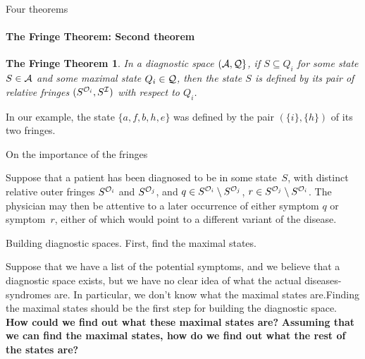 \documentclass{beamer}
\newtheorem{fringe}[theorem]{The Fringe Theorem}
\def\tl{\vskip 2mm}
\def\wl{\vskip 4mm}
\def\SB{\subseteq}
\def\AAA{{\cal A}}
\def\III{{\cal I}}
\def\OOO{{\cal O}}
\def\QQQ{{\cal Q}}
\begin{document}
\begin{frame}{Four theorems}
\framesubtitle{The Fringe Theorem: Second theorem}
\vspace{1cm}
\begin{fringe}
 In a diagnostic space $(\AAA,\QQQ\}$, if $S\SB Q_i$ for some state $S\in \AAA$ and some maximal state $Q_i\in\QQQ$, then the state $S$ is defined by its pair of relative fringes 
$(S^{\OOO_i},S^{\III})$
with respect to $Q_i$. 
\end{fringe}
\wl
In our example, the state $\{a,f,b,h,e\}$ was defined by the pair $(\{i\},\{h\})$ of its two fringes.
 \vspace{.5cm}

\end{frame}
\begin{frame}{On the importance of the fringes}
\center
\begin{minipage}{11cm}

Suppose that a patient has been diagnosed to be in some state~$S$, with distinct relative outer fringes $S^{\OOO_i}$ and $S^{\OOO_j}$, and $q\in S^{\OOO_i}\setminus S^{\OOO_j}$, $r\in S^{\OOO_j}\setminus S^{\OOO_i}$. The physician may then be attentive to a later occurrence of either symptom $q$ or symptom~$r$, either of which would point  to a different variant of the disease.  

\end{minipage}
 \vspace{.5cm}

\end{frame}
\begin{frame}{Building diagnostic spaces. First, find the maximal states.}
\center
\begin{minipage}{10cm} Suppose that we have a list of the potential symptoms, and we believe that a diagnostic space exists, but we have no clear idea of what the actual diseases-syndromes are. 
\tl
In particular, we don't know what the maximal states are.\linebreak Finding the maximal states should be the first step for building the diagnostic space. 
\tl
{\bf How could we find out  what these maximal states are?}
\tl
{\bf Assuming that we can find the maximal states, how do we find out what the rest of the states are?}
\end{minipage}
 \vspace{.5cm}

\end{frame}
\end{document}
